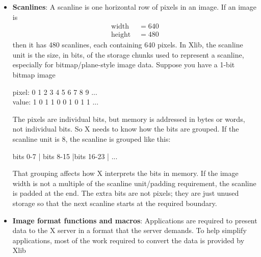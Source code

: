 \documentclass{report}
\begin{document}
\begin{itemize}
\begin{itemize}
\begin{center}
                        plane 3: \qquad pixel0\_bit3 pixel1\_bit3 pixel2\_bit3 ...
                    \end{center}
                    This is why it is called XY format: it stores bitmap-style x/y image planes, one plane after another.
                \item \textbf{XY format (XYBitmap)}: XYBitmap is a special case of XY format for depth 1 images. A bitmap has only one bit per pixel. So, there is only one plane. This is used for masks, stipples, cursors, icons, and other monochrome data.
            \end{itemize}
        \item \textbf{Scanlines}: A scanline is one horizontal row of pixels in an image. If an image is 
            \begin{align*}
                \text{width } &= 640 \\
                \text{height } &= 480
            \end{align*}
            then it has 480 scanlines, each containing 640 pixels. 
            \bigbreak \noindent 
            In Xlib, the scanline unit is the size, in bits, of the storage chunks used to represent a scanline, especially for bitmap/plane-style image data.
            \bigbreak \noindent 
            Suppose you have a 1-bit bitmap image
            \bigbreak \noindent 
            \begin{center}
                pixel:   0 1 2 3 4 5 6 7 8 9 ... \\
                value:   1 0 1 1 0 0 1 0 1 1 ...
            \end{center}
            The pixels are individual bits, but memory is addressed in bytes or words, not individual bits. So X needs to know how the bits are grouped.
            \bigbreak \noindent 
            If the scanline unit is 8, the scanline is grouped like this:
            \begin{center}
                bits 0-7   \qquad | \qquad bits 8-15  \qquad |\qquad  bits 16-23 \qquad| \qquad ...
            \end{center}
            That grouping affects how X interprets the bits in memory.
            \bigbreak \noindent 
            If the image width is not a multiple of the scanline unit/padding requirement, the scanline is padded at the end. The extra bits are not pixels; they are just unused storage so that the next scanline starts at the required boundary.
        \item \textbf{Image format functions and macros}: Applications are required to present data to the X server in a format that the server demands. To help simplify applications, most of the work required to convert the data is provided by Xlib

\end{itemize}
\end{document}
